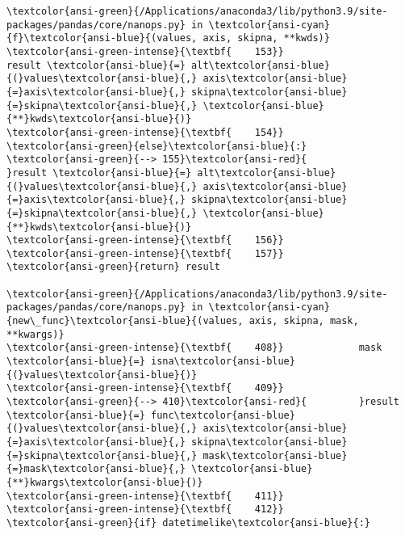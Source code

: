 \documentclass[11pt]{article}
\begin{document}
\begin{Verbatim}[commandchars=\\\{\}, frame=single, framerule=2mm, rulecolor=\color{outerrorbackground}]
\textcolor{ansi-green}{/Applications/anaconda3/lib/python3.9/site-packages/pandas/core/nanops.py} in \textcolor{ansi-cyan}{f}\textcolor{ansi-blue}{(values, axis, skipna, **kwds)}
\textcolor{ansi-green-intense}{\textbf{    153}}                     result \textcolor{ansi-blue}{=} alt\textcolor{ansi-blue}{(}values\textcolor{ansi-blue}{,} axis\textcolor{ansi-blue}{=}axis\textcolor{ansi-blue}{,} skipna\textcolor{ansi-blue}{=}skipna\textcolor{ansi-blue}{,} \textcolor{ansi-blue}{**}kwds\textcolor{ansi-blue}{)}
\textcolor{ansi-green-intense}{\textbf{    154}}             \textcolor{ansi-green}{else}\textcolor{ansi-blue}{:}
\textcolor{ansi-green}{--> 155}\textcolor{ansi-red}{                 }result \textcolor{ansi-blue}{=} alt\textcolor{ansi-blue}{(}values\textcolor{ansi-blue}{,} axis\textcolor{ansi-blue}{=}axis\textcolor{ansi-blue}{,} skipna\textcolor{ansi-blue}{=}skipna\textcolor{ansi-blue}{,} \textcolor{ansi-blue}{**}kwds\textcolor{ansi-blue}{)}
\textcolor{ansi-green-intense}{\textbf{    156}} 
\textcolor{ansi-green-intense}{\textbf{    157}}             \textcolor{ansi-green}{return} result

\textcolor{ansi-green}{/Applications/anaconda3/lib/python3.9/site-packages/pandas/core/nanops.py} in \textcolor{ansi-cyan}{new\_func}\textcolor{ansi-blue}{(values, axis, skipna, mask, **kwargs)}
\textcolor{ansi-green-intense}{\textbf{    408}}             mask \textcolor{ansi-blue}{=} isna\textcolor{ansi-blue}{(}values\textcolor{ansi-blue}{)}
\textcolor{ansi-green-intense}{\textbf{    409}} 
\textcolor{ansi-green}{--> 410}\textcolor{ansi-red}{         }result \textcolor{ansi-blue}{=} func\textcolor{ansi-blue}{(}values\textcolor{ansi-blue}{,} axis\textcolor{ansi-blue}{=}axis\textcolor{ansi-blue}{,} skipna\textcolor{ansi-blue}{=}skipna\textcolor{ansi-blue}{,} mask\textcolor{ansi-blue}{=}mask\textcolor{ansi-blue}{,} \textcolor{ansi-blue}{**}kwargs\textcolor{ansi-blue}{)}
\textcolor{ansi-green-intense}{\textbf{    411}} 
\textcolor{ansi-green-intense}{\textbf{    412}}         \textcolor{ansi-green}{if} datetimelike\textcolor{ansi-blue}{:}


\end{Verbatim}
\end{document}
